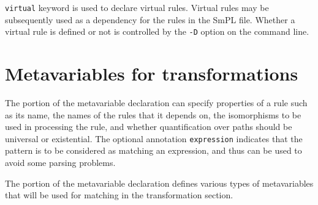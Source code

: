\texttt{virtual} keyword is used to declare virtual rules. Virtual
rules may be subsequently used as a dependency for the rules in the
SmPL file. Whether a virtual rule is defined or not is controlled by
the \texttt{-D} option on the command line.


\section{Metavariables for transformations}

The  portion of the metavariable declaration can specify
properties of a rule such as its name, the names of the rules that it
depends on, the isomorphisms to be used in processing the rule, and whether
quantification over paths should be universal or existential.  The optional
annotation {\tt expression} indicates that the pattern is to be considered
as matching an expression, and thus can be used to avoid some parsing
problems.

The  portion of the metavariable declaration defines various
types of metavariables that will be used for matching in the transformation
section.

\begin{grammar}






\end{grammar}

